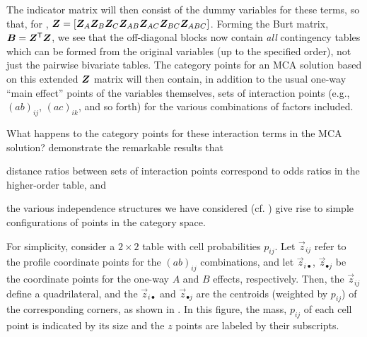 The indicator matrix will then consist of the dummy variables for
these terms, so that, for ,
$\bm{Z} = [
 \bm{Z}_A  \bm{Z}_B  \bm{Z}_C  \bm{Z}_{AB}
 \bm{Z}_{AC}  \bm{Z}_{BC}  \bm{Z}_{ABC}
]$.
Forming the Burt matrix, $ \bm{B} =  \bm{Z}^\mathsf{T}  \bm{Z}$,
we see that the off-diagonal blocks now contain \emph{all}
contingency tables which can be formed from the original variables
(up to the specified order), not just the pairwise bivariate
tables.
The category points for an MCA solution based on this
extended $\bm{Z}$ matrix will then contain, in addition to the
usual one-way ``main effect'' points
of the variables themselves, sets of interaction points
(e.g., $(ab)_{ij}$, $(ac)_{ik}$, and so forth) for the various
combinations of factors included.

What happens to the category points for these interaction terms in the MCA
solution?
\citet{MeulmanHeiser:97} demonstrate the remarkable results that
\begin{itemize*}
\item distance ratios between sets of interaction points correspond to
odds ratios in the higher-order table,
and
\item the various independence structures we have considered
(cf. )
give rise to simple configurations of points in the category
space.
\end{itemize*}

For simplicity, consider a $2\times 2$ table with cell probabilities
$p_{ij}$.  Let $\vec{z}_{ij}$
refer to the profile coordinate points for the $(ab)_{ij}$
combinations, and let $\vec{z}_{i\bullet}$, $\vec{z}_{\bullet j}$
be the coordinate points for the one-way $A$ and $B$ effects,
respectively.  Then, the  $\vec{z}_{ij}$ define a quadrilateral,
and the $\vec{z}_{i\bullet}$ and $\vec{z}_{\bullet j}$ are the
centroids (weighted by $p_{ij}$) of the corresponding corners,
as shown in .  In this figure, the mass, $p_{ij}$ of each cell point is indicated by its size and the $z$ points are labeled
by their subscripts.

